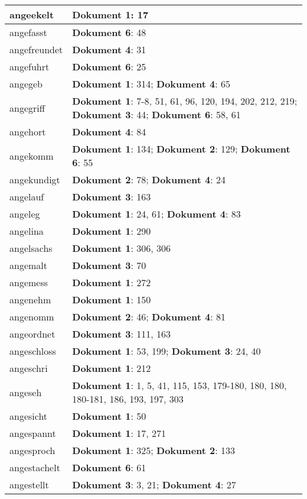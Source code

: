 \documentclass[a5paper]{article}
\begin{document}
\begin{longtable}[l]{|l|p{3in}|}
\hline
angeekelt & \textbf{Dokument 1}: 17 \\
\hline
angefasst & \textbf{Dokument 6}: 48 \\
\hline
angefreundet & \textbf{Dokument 4}: 31 \\
\hline
angefuhrt & \textbf{Dokument 6}: 25 \\
\hline
angegeb & \textbf{Dokument 1}: 314; \textbf{Dokument 4}: 65 \\
\hline
angegriff & \textbf{Dokument 1}: 7-8, 51, 61, 96, 120, 194, 202, 212, 219; \textbf{Dokument 3}: 44; \textbf{Dokument 6}: 58, 61 \\
\hline
angehort & \textbf{Dokument 4}: 84 \\
\hline
angekomm & \textbf{Dokument 1}: 134; \textbf{Dokument 2}: 129; \textbf{Dokument 6}: 55 \\
\hline
angekundigt & \textbf{Dokument 2}: 78; \textbf{Dokument 4}: 24 \\
\hline
angelauf & \textbf{Dokument 3}: 163 \\
\hline
angeleg & \textbf{Dokument 1}: 24, 61; \textbf{Dokument 4}: 83 \\
\hline
angelina & \textbf{Dokument 1}: 290 \\
\hline
angelsachs & \textbf{Dokument 1}: 306, 306 \\
\hline
angemalt & \textbf{Dokument 3}: 70 \\
\hline
angemess & \textbf{Dokument 1}: 272 \\
\hline
angenehm & \textbf{Dokument 1}: 150 \\
\hline
angenomm & \textbf{Dokument 2}: 46; \textbf{Dokument 4}: 81 \\
\hline
angeordnet & \textbf{Dokument 3}: 111, 163 \\
\hline
angeschloss & \textbf{Dokument 1}: 53, 199; \textbf{Dokument 3}: 24, 40 \\
\hline
angeschri & \textbf{Dokument 1}: 212 \\
\hline
angeseh & \textbf{Dokument 1}: 1, 5, 41, 115, 153, 179-180, 180, 180, 180-181, 186, 193, 197, 303 \\
\hline
angesicht & \textbf{Dokument 1}: 50 \\
\hline
angespannt & \textbf{Dokument 1}: 17, 271 \\
\hline
angesproch & \textbf{Dokument 1}: 325; \textbf{Dokument 2}: 133 \\
\hline
angestachelt & \textbf{Dokument 6}: 61 \\
\hline
angestellt & \textbf{Dokument 3}: 3, 21; \textbf{Dokument 4}: 27 \\

\end{longtable}
\end{document}
